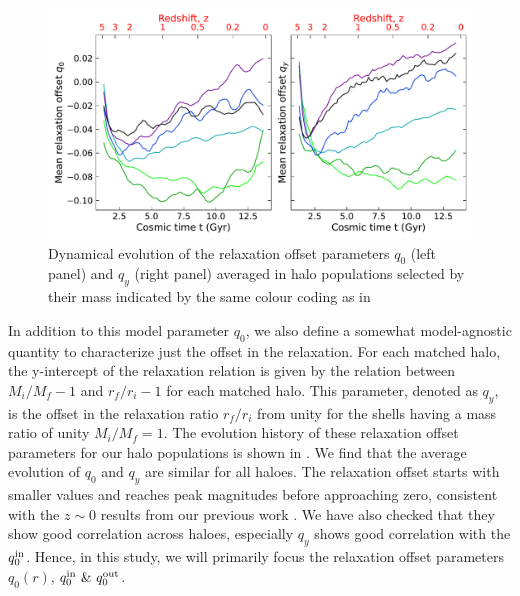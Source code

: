 \begin{figure}[htbp]
\centering
\includegraphics[width=\linewidth]{plots/dynam_relxn/hal_relxn_offset_evolve.pdf}    \caption{Dynamical evolution of the relaxation offset parameters $q_0$ (left panel) and $q_y$ (right panel) averaged in halo populations selected by their mass indicated by the same colour coding as in }
\label{fig:evolution-hal-reln-offset}
\end{figure}
In addition to this model parameter $q_0$, we also define a somewhat model-agnostic quantity to characterize just the offset in the relaxation. For each matched halo, the y-intercept of the relaxation relation is given by the relation between $M_i/M_f-1$ and $r_f/r_i-1$ for each matched halo. This parameter, denoted as $q_y$, is the offset in the relaxation ratio $r_f/r_i$ from unity for the shells having a mass ratio of unity $M_i/M_f=1$. The evolution history of these relaxation offset parameters for our halo populations is shown in . We find that the average evolution of $q_0$ and $q_y$ are similar for all haloes. The relaxation offset starts with smaller values and reaches peak magnitudes before approaching zero, consistent with the $z \sim 0$ results from our previous work \citep{2023Velmani&Paranjape}. We have also checked that they show good correlation across haloes, especially $q_y$ shows good correlation with the $q_0^{\rm{in}}$. Hence, in this study, we will primarily focus the relaxation offset parameters $q_0(r)$,  $q_0^{\rm{in}} ~\& ~q_0^{\rm{out}}$.





